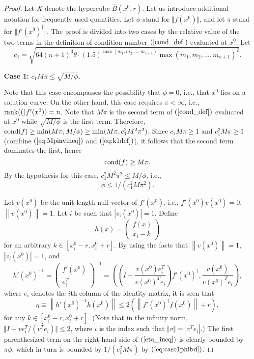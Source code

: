 \documentclass{article}
\newcommand{\cond}[1]{\mathop{\rm{cond}}(#1)}
\newcommand{\norm}[1]{\left\|#1\right\|} \newcommand{\norma}[1]{\left\|#1\right\|}   \newcommand{\inv}[1]{#1^{-1}}
\newcommand{\mpinv}[1]{#1^{\dagger}}  \newcommand\eps{\epsilon}
\newcommand\eref[1]{$(\ref{#1})$}
\newcommand{\rank}[1]{\mathop{\rm{rank}}(#1)}
\begin{document}
\begin{proof}
Let $X$ denote the hypercube $\bar{B}(x^0,r)$. 
Let us introduce additional notation for frequently used quantities.
Let $\phi$ stand for $\Vert f(x^0)\Vert$, and
let $\pi$ 
stand for $\Vert \mpinv{f'(x^0)}\Vert$.
The proof is
divided into two cases by the relative value of the two
terms in the definition of condition number \eref{cond_def} 
evaluated at $x^0$.
Let 
\begin{equation}
c_1=\sqrt{64(n+1)^3\theta\cdot (1.5)^{\max(m_1,m_2,\ldots,m_{n+1})}\max(m_1,m_2,\ldots,m_{n+1})^2}.
\label{eq:k1def}
\end{equation}

\begin{flushleft} \textbf{Case 1: } $c_1M\pi \le \sqrt{M/\phi}$.
\end{flushleft}
Note that this case encompasses the possibility that $\phi=0$, i.e.,
that $x^0$ lies on a solution curve.  On the other hand, this
case requires $\pi<\infty$, i.e., $\rank(f'(x^0))=n$.
Note that $M\pi$ is the second term of \eref{cond_def} evaluated
at $x^0$ while $\sqrt{M/\phi}$ is the first term.  Therefore,
$\cond{f}\ge \min(M\pi,M/\phi)\ge \min(M\pi,c_1^2 M^2\pi^2).$
Since $c_1M\pi\ge 1$ and $c_1^2M\pi\ge 1$
(combine \eref{eq:Mpinvineq} and \eref{eq:k1def}), it follows
that the second term dominates the first, hence 
\begin{equation}
\cond{f}\ge M\pi.
\label{eq:case1condf}
\end{equation}
By the hypothesis for this case, $c_1^2 M^2\pi^2\le M/\phi$, i.e.,
\begin{equation}
\phi\le 1/(c_1^2M\pi^2).  
\label{eq:case1phibd}
\end{equation}

Let $v(x^0)$ be the unit-length null vector of $f'(x^0)$, i.e.,
$f'(x^0)v(x^0) = 0$, $\norm{v(x^0)}=1$.  Let $i$ be such that
$|v_i(x^0)| = 1$. Define 
$$h(x) = \left(\begin{array}{cc}f(x)\\ x_i - k\end{array}\right)$$
for an arbitrary $k\in[
x^0_i - r, x^0_i + r]$. By using the facts that
$\norm{v(x^0)}=1$, $|v_i(x^0)| = 1$, and
\[ h'(x^0)^{-1} = \left(\begin{array}{c}
f'(x^0) \\ e_i^T \end{array} \right)^{-1} = \left(
\left(I-\frac{v(x^0)e_i^T}{v(x^0)^T e_i}\right)\mpinv{f'(x^0)}
,\frac{v(x^0)}{v(x^0)^T e_i} \right),
\]
where $e_i$ denotes the $i$th column of the identity matrix, it is
seen that
\begin{equation}
\label{eta_ineq} \eta \equiv \norm{h'(x^0)^{-1}h(x^0)} \leq
2\left( \norm{\mpinv{f'(x^0)}f(x^0)}  + r \right),
\end{equation}
for any $k \in [x^0_i-r,x^0_i+r]$. 
(Note that in the infinity norm, $\Vert I-ve_i^T/(v^Te_i)\Vert\le 2$, 
where $i$ is the index such that $\Vert v\Vert=|v^Te_i|$.)
The first parenthesized
term on the right-hand side of \eref{eta_ineq} is clearly bounded
by $\pi\phi$, which in turn is bounded by $1/(c_1^2M\pi)$ by
\eref{eq:case1phibd}.


\end{proof}
\end{document}
